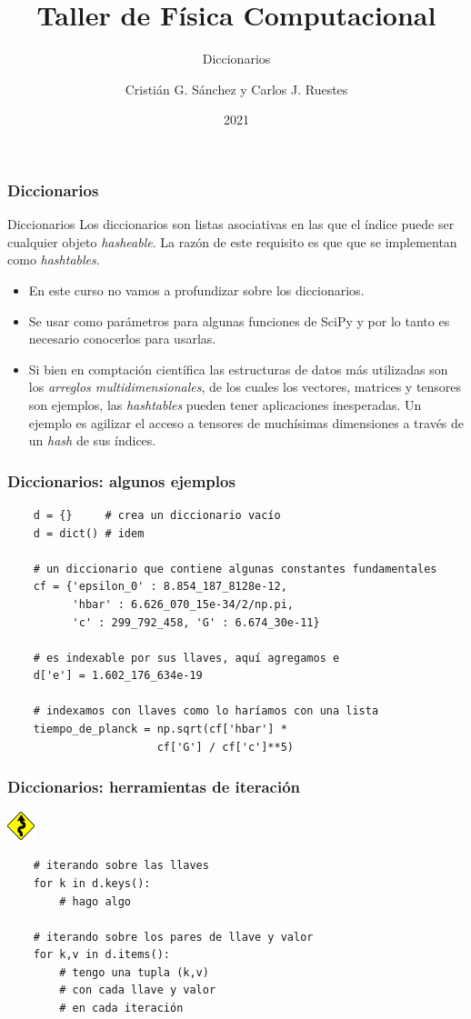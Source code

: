 \documentclass{beamer}
\title{Taller de Física Computacional}
\subtitle{Diccionarios}
\author{Cristián G. Sánchez y Carlos J. Ruestes}
\date{2021}
\begin{document}
\frame{\titlepage}

\begin{frame}[fragile]
    \frametitle{Diccionarios}
    \begin{block}{Diccionarios}
        Los diccionarios son listas asociativas en las que el índice puede ser cualquier objeto {\em hasheable}.
        La razón de este requisito es que que se implementan como {\em hashtables}. 
        \begin{itemize}
        \item En este curso no vamos a profundizar sobre los diccionarios.
        \item Se usar como parámetros para algunas funciones de SciPy y por lo tanto es necesario conocerlos para usarlas.
        \item Si bien en comptación científica las estructuras de datos más utilizadas son los {\em arreglos multidimensionales}, de los cuales los vectores, matrices y tensores son ejemplos,
        las {\em hashtables} pueden tener aplicaciones inesperadas. Un ejemplo es agilizar el acceso a tensores de muchísimas dimensiones a través de un {\em hash} de sus índices.
        \end{itemize}
    \end{block}
    \end{frame}

\begin{frame}[fragile]
    \frametitle{Diccionarios: algunos ejemplos}
    \begin{verbatim}
    d = {}     # crea un diccionario vacío
    d = dict() # idem

    # un diccionario que contiene algunas constantes fundamentales
    cf = {'epsilon_0' : 8.854_187_8128e-12, 
          'hbar' : 6.626_070_15e-34/2/np.pi,
          'c' : 299_792_458, 'G' : 6.674_30e-11}

    # es indexable por sus llaves, aquí agregamos e
    d['e'] = 1.602_176_634e-19

    # indexamos con llaves como lo haríamos con una lista
    tiempo_de_planck = np.sqrt(cf['hbar'] *
                       cf['G'] / cf['c']**5) 
    \end{verbatim}
    \end{frame}

\begin{frame}[fragile]
    \frametitle{Diccionarios: herramientas de iteración}
    \includegraphics[height=0.8cm, width=0.8cm]{figuras/sin.png}
    \begin{verbatim}
    # iterando sobre las llaves
    for k in d.keys():
        # hago algo 

    # iterando sobre los pares de llave y valor
    for k,v in d.items():
        # tengo una tupla (k,v)
        # con cada llave y valor 
        # en cada iteración
    \end{verbatim}
    \end{frame}
\end{document}
